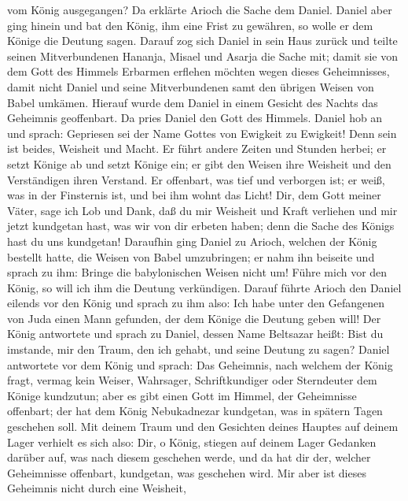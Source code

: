 vom König ausgegangen? Da erklärte Arioch die Sache dem Daniel.
 Daniel aber ging hinein und bat den König, ihm eine
Frist zu gewähren, so wolle er dem Könige die Deutung sagen.
 Darauf zog sich Daniel in sein Haus zurück und teilte
seinen Mitverbundenen Hananja, Misael und Asarja die Sache mit;
 damit sie von dem Gott des Himmels Erbarmen erflehen
möchten wegen dieses Geheimnisses, damit nicht Daniel und seine
Mitverbundenen samt den übrigen Weisen von Babel umkämen.
 Hierauf wurde dem Daniel in einem Gesicht des Nachts das
Geheimnis geoffenbart. Da pries Daniel den Gott des Himmels.
 Daniel hob an und sprach: Gepriesen sei der Name Gottes
von Ewigkeit zu Ewigkeit! Denn sein ist beides, Weisheit und Macht.
 Er führt andere Zeiten und Stunden herbei; er setzt
Könige ab und setzt Könige ein; er gibt den Weisen ihre Weisheit und den
Verständigen ihren Verstand.  Er offenbart, was tief und
verborgen ist; er weiß, was in der Finsternis ist, und bei ihm wohnt das
Licht!  Dir, dem Gott meiner Väter, sage ich Lob und
Dank, daß du mir Weisheit und Kraft verliehen und mir jetzt kundgetan
hast, was wir von dir erbeten haben; denn die Sache des Königs hast du
uns kundgetan!  Daraufhin ging Daniel zu Arioch, welchen
der König bestellt hatte, die Weisen von Babel umzubringen; er nahm ihn
beiseite und sprach zu ihm: Bringe die babylonischen Weisen nicht um!
Führe mich vor den König, so will ich ihm die Deutung verkündigen.
 Darauf führte Arioch den Daniel eilends vor den König
und sprach zu ihm also: Ich habe unter den Gefangenen von Juda einen
Mann gefunden, der dem Könige die Deutung geben will! 
Der König antwortete und sprach zu Daniel, dessen Name Beltsazar heißt:
Bist du imstande, mir den Traum, den ich gehabt, und seine Deutung zu
sagen?  Daniel antwortete vor dem König und sprach: Das
Geheimnis, nach welchem der König fragt, vermag kein Weiser, Wahrsager,
Schriftkundiger oder Sterndeuter dem Könige kundzutun; 
aber es gibt einen Gott im Himmel, der Geheimnisse offenbart; der hat
dem König Nebukadnezar kundgetan, was in spätern Tagen geschehen soll.
 Mit deinem Traum und den Gesichten deines Hauptes auf
deinem Lager verhielt es sich also: Dir, o König, stiegen auf deinem
Lager Gedanken darüber auf, was nach diesem geschehen werde, und da hat
dir der, welcher Geheimnisse offenbart, kundgetan, was geschehen wird.
 Mir aber ist dieses Geheimnis nicht durch eine Weisheit,
